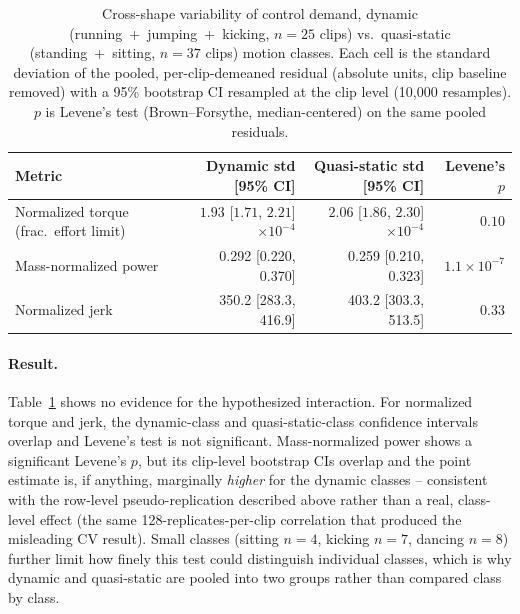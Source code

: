 \begin{table}[t]
\centering
\small
\caption{Cross-shape variability of control demand, dynamic
(running~+~jumping~+~kicking, $n{=}25$ clips) vs.\ quasi-static
(standing~+~sitting, $n{=}37$ clips) motion classes. Each cell is the
standard deviation of the pooled, per-clip-demeaned residual (absolute
units, clip baseline removed) with a 95\% bootstrap CI resampled at the
clip level (10,000 resamples). $p$ is Levene's test (Brown--Forsythe,
median-centered) on the same pooled residuals.}\label{tab:physical_analysis}
\begin{tabular}{lrrr}
\toprule
Metric & Dynamic std [95\% CI] & Quasi-static std [95\% CI] & Levene's $p$ \\
\midrule
Normalized torque (frac.\ effort limit) & $1.93$ [$1.71$, $2.21$] $\times10^{-4}$ & $2.06$ [$1.86$, $2.30$] $\times10^{-4}$ & $0.10$ \\
Mass-normalized power & 0.292 [0.220, 0.370] & 0.259 [0.210, 0.323] & $1.1\times10^{-7}$ \\
Normalized jerk & 350.2 [283.3, 416.9] & 403.2 [303.3, 513.5] & 0.33 \\
\bottomrule
\end{tabular}
\end{table}

\paragraph{Result.} Table~\ref{tab:physical_analysis} shows no evidence for
the hypothesized interaction. For normalized torque and jerk, the
dynamic-class and quasi-static-class confidence intervals overlap and
Levene's test is not significant. Mass-normalized power shows a significant
Levene's $p$, but its clip-level bootstrap CIs overlap and the point
estimate is, if anything, marginally \emph{higher} for the dynamic classes
-- consistent with the row-level pseudo-replication described above rather
than a real, class-level effect (the same 128-replicates-per-clip
correlation that produced the misleading CV result). Small classes
(sitting $n{=}4$, kicking $n{=}7$, dancing $n{=}8$) further limit how finely
this test could distinguish individual classes, which is why dynamic and
quasi-static are pooled into two groups rather than compared class by
class.

